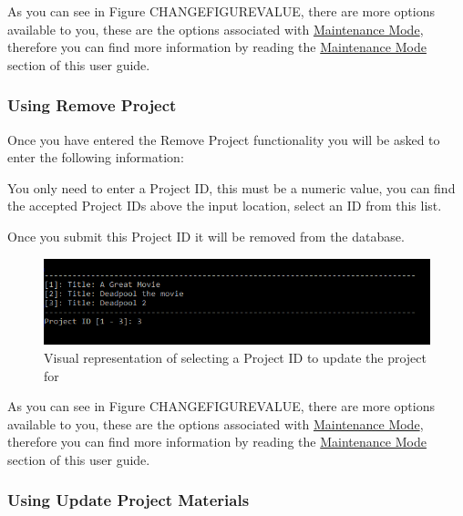 \documentclass[
  english,
  a4paper,
,tablecaptionabove
]{scrartcl}
\begin{document}
As you can see in Figure CHANGEFIGUREVALUE, there are more options
available to you, these are the options associated with
\protect\hyperlink{using-maintenance-mode}{Maintenance Mode}, therefore
you can find more information by reading the
\protect\hyperlink{using-maintenance-mode}{Maintenance Mode} section of
this user guide.

\newpage

\hypertarget{using-remove-project}{%
\subsubsection{Using Remove Project}\label{using-remove-project}}

Once you have entered the Remove Project functionality you will be asked
to enter the following information:

You only need to enter a Project ID, this must be a numeric value, you
can find the accepted Project IDs above the input location, select an ID
from this list.

Once you submit this Project ID it will be removed from the database.

\begin{figure}
\centering
\includegraphics{images/user-guide/maintenance-mode/remove-project-select-id.png}
\caption{Visual representation of selecting a Project ID to update the
project for}
\end{figure}

As you can see in Figure CHANGEFIGUREVALUE, there are more options
available to you, these are the options associated with
\protect\hyperlink{using-maintenance-mode}{Maintenance Mode}, therefore
you can find more information by reading the
\protect\hyperlink{using-maintenance-mode}{Maintenance Mode} section of
this user guide.

\newpage

\hypertarget{using-update-project-materials}{%
\subsubsection{Using Update Project
Materials}\label{using-update-project-materials}}
\end{document}
